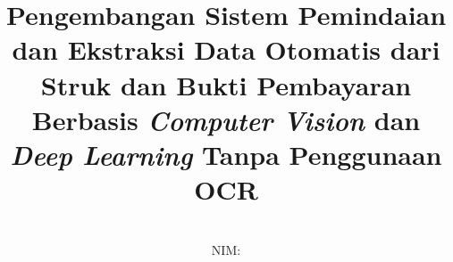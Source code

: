 \documentclass[bahasa, 12pt, a4paper, onecolumn, oneside, final]{report}
\begin{document}
\title{Pengembangan Sistem Pemindaian dan Ekstraksi Data Otomatis dari Struk dan Bukti Pembayaran Berbasis \emph{Computer Vision} dan \emph{Deep Learning} Tanpa Penggunaan OCR}
\date{}
\author{
	\MakeUppercase{\namapenulis \\
		NIM: \nimpenulis}
}

\setcounter{page}{1}





\pagestyle{plain}


% 



\titlespacing*{\chapter}{0pt}{0pt}{4pt}

\renewcommand{\contentsname}{DAFTAR ISI}
\renewcommand{\listfigurename}{DAFTAR GAMBAR}
\renewcommand{\listtablename}{DAFTAR TABEL}
\renewcommand{\bibname}{DAFTAR PUSTAKA}

\tableofcontents
\listofappendices
\newpage

\listoffigures
\listoftables
\newpage

\listofequations

\newpage

\end{document}
